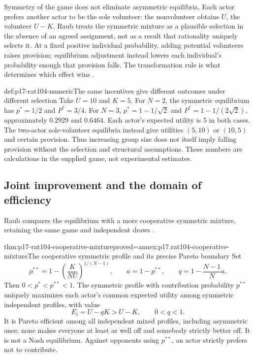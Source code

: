 Symmetry of the game does not eliminate asymmetric equilibria. Each actor
prefers another actor to be the sole volunteer: the nonvolunteer obtains
\(U\), the volunteer \(U-K\). Raub treats the symmetric mixture as a
plausible selection in the absence of an agreed assignment, not as a result
that rationality uniquely selects it. At a fixed positive individual
probability, adding potential volunteers raises provision; equilibrium
adjustment instead lowers each individual's probability enough that provision
falls. The transformation rule is what determines which effect wins
\parencite[pp.~613--614]{Raub2021RationalChoiceSocialSciences}.

\begin{hbexample}{def:p17-rat104-numeric}{The same incentives give different outcomes under different selection}
Take \(U=10\) and \(K=5\). For \(N=2\), the symmetric equilibrium has
\(p^*=1/2\) and \(P^*=3/4\). For \(N=3\),
\(p^*=1-1/\sqrt2\) and \(P^*=1-1/(2\sqrt2)\), approximately
\(0.2929\) and \(0.6464\). Each actor's expected utility is 5 in both
cases. The two-actor sole-volunteer equilibria instead give utilities
\((5,10)\) or \((10,5)\) and certain provision.
Thus increasing group size does not itself imply falling provision without
the selection and structural assumptions. These numbers are calculations
in the supplied game, not experimental estimates.
\end{hbexample}

\subsection{Joint improvement and the domain of efficiency}

Raub compares the equilibrium with a more cooperative symmetric mixture,
retaining the same game and independent draws
\parencite[p.~615]{Raub2021RationalChoiceSocialSciences}.

\begin{hbtheorem}{thm:p17-rat104-cooperative-mixture}{proved=annex:p17.rat104-cooperative-mixture}{The cooperative symmetric profile and its precise Pareto boundary}
Set
\[
 p^{**}=1-\left(\frac{K}{NU}\right)^{1/(N-1)},\qquad
 a=1-p^{**},\qquad q=1-\frac{N-1}{N}a.
\]
Then \(0<p^*<p^{**}<1\). The symmetric profile with contribution
probability \(p^{**}\) uniquely maximizes each actor's common expected
utility among symmetric independent profiles, with value
\[
 E_i=U-qK>U-K,\qquad 0<q<1.
\]
It is Pareto efficient among all independent mixed profiles, including
asymmetric ones: none makes everyone at least as well off and somebody
strictly better off. It is not a Nash equilibrium. Against opponents using
\(p^{**}\), an actor strictly prefers not to contribute.
\end{hbtheorem}

